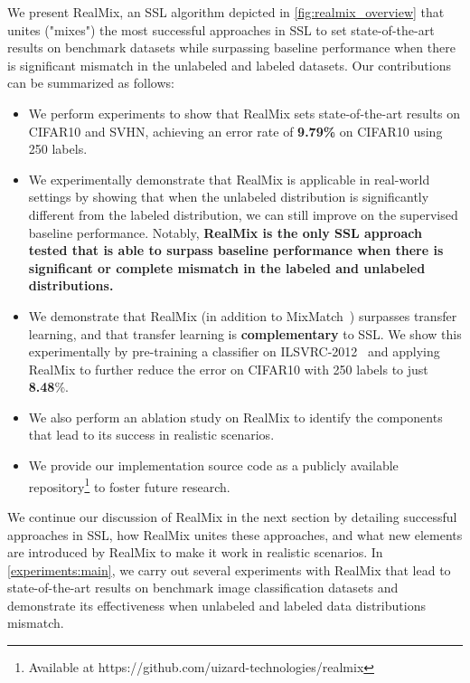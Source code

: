 \documentclass[10pt,twocolumn,letterpaper]{article}
\begin{document}
We present RealMix, an SSL algorithm depicted in \cref{fig:realmix_overview} that unites ("mixes") the most successful approaches in SSL to set state-of-the-art results on benchmark datasets while surpassing baseline performance when there is significant mismatch in the unlabeled and labeled datasets. Our contributions can be summarized as follows:
\begin{itemize}
    \item We perform experiments to show that RealMix sets state-of-the-art results on CIFAR10 and SVHN, achieving an error rate of \textbf{9.79\%} on CIFAR10 using 250 labels.
    \item We experimentally demonstrate that RealMix is applicable in real-world settings by showing that when the unlabeled distribution is significantly different from the labeled distribution, we can still improve on the supervised baseline performance. Notably, \textbf{RealMix is the only SSL approach tested that is able to surpass baseline performance when there is significant or complete mismatch in the labeled and unlabeled distributions.}
    \item We demonstrate that RealMix (in addition to MixMatch~\cite{mixmatchBerthelot}) surpasses transfer learning, and that transfer learning is \textbf{complementary} to SSL. We show this experimentally by pre-training a classifier on ILSVRC-2012~\cite{imagenet} and applying RealMix to further reduce the error on CIFAR10 with 250 labels to just \textbf{8.48}\%.
    \item We also perform an ablation study on RealMix to identify the components that lead to its success in realistic scenarios.
    \item We provide our implementation source code as a publicly available repository\footnote{Available at https://github.com/uizard-technologies/realmix} to foster future research.
\end{itemize}

We continue our discussion of RealMix in the next section by detailing successful approaches in SSL, how RealMix unites these approaches, and what new elements are introduced by RealMix to make it work in realistic scenarios. In \cref{experiments:main}, we carry out several experiments with RealMix that lead to state-of-the-art results on benchmark image classification datasets and demonstrate its effectiveness when unlabeled and labeled data distributions mismatch.
\end{document}
